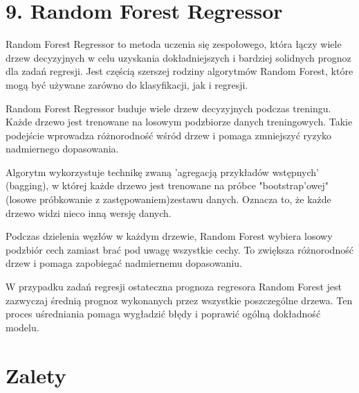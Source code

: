 {}
\justify
\fontsize{14}{16}\selectfont
\setlength{\parindent}{0pt}
\section*{9. Random Forest Regressor \cite{alma991000280759708832}}
\fontsize{12}{14}\selectfont
\vspace{-1.0em}

\hspace{1.5cm} Random Forest Regressor to metoda uczenia się zespołowego, która łączy wiele drzew decyzyjnych w celu uzyskania dokładniejszych i bardziej solidnych prognoz dla zadań regresji. Jest częścią szerszej rodziny algorytmów Random Forest, które mogą być używane zarówno do klasyfikacji, jak i regresji.

\hspace{1.5cm} Random Forest Regressor buduje wiele drzew decyzyjnych podczas treningu. Każde drzewo jest trenowane na losowym podzbiorze danych treningowych. Takie podejście wprowadza różnorodność wśród drzew i pomaga zmniejszyć ryzyko nadmiernego dopasowania.

\hspace{1.5cm} Algorytm wykorzystuje technikę zwaną 'agregacją przykładów wstępnych' (bagging), w której każde drzewo jest trenowane na próbce "bootstrap'owej" (losowe próbkowanie z zastępowaniem)zestawu danych. Oznacza to, że każde drzewo widzi nieco inną wersję danych.

\hspace{1.5cm} Podczas dzielenia węzłów w każdym drzewie, Random Forest wybiera losowy podzbiór cech zamiast brać pod uwagę wszystkie cechy. To zwiększa różnorodność drzew i pomaga zapobiegać nadmiernemu dopasowaniu.

\hspace{1.5cm} W przypadku zadań regresji ostateczna prognoza regresora Random Forest jest zazwyczaj średnią prognoz wykonanych przez wszystkie poszczególne drzewa. Ten proces uśredniania pomaga wygładzić błędy i poprawić ogólną dokładność modelu.

{}
\section*{Zalety }
\vspace{-1.0em}


